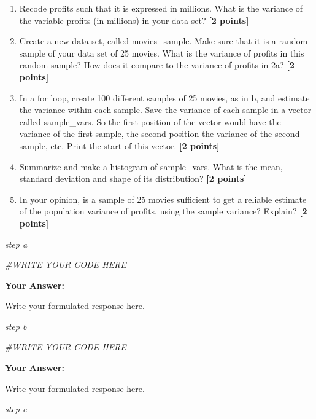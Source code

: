 \documentclass[
]{article}
\newenvironment{Shaded}{\begin{snugshade}}{\end{snugshade}}
\newcommand{\CommentTok}[1]{\textcolor[rgb]{0.56,0.35,0.01}{\textit{#1}}}
\providecommand{\tightlist}{%
  \setlength{\itemsep}{0pt}\setlength{\parskip}{0pt}}
\begin{document}
\begin{enumerate}
\def\labelenumi{\alph{enumi}.}
\tightlist
\item
  Recode profits such that it is expressed in millions. What is the
  variance of the variable profits (in millions) in your data set?
  \textbf{[2 points]}
\item
  Create a new data set, called movies\_sample. Make sure that it is a
  random sample of your data set of 25 movies. What is the variance of
  profits in this random sample? How does it compare to the variance of
  profits in 2a? \textbf{[2 points]}
\item
  In a for loop, create 100 different samples of 25 movies, as in b, and
  estimate the variance within each sample. Save the variance of each
  sample in a vector called sample\_vars. So the first position of the
  vector would have the variance of the first sample, the second
  position the variance of the second sample, etc. Print the start of
  this vector. \textbf{[2 points]}
\item
  Summarize and make a histogram of sample\_vars. What is the mean,
  standard deviation and shape of its distribution? \textbf{[2 points]}
\item
  In your opinion, is a sample of 25 movies sufficient to get a reliable
  estimate of the population variance of profits, using the sample
  variance? Explain? \textbf{[2 points]}
\end{enumerate}

\emph{step a}

\begin{Shaded}
\begin{Highlighting}[]
\CommentTok{\#WRITE YOUR CODE HERE}
\end{Highlighting}
\end{Shaded}

\textbf{Your Answer:}

Write your formulated response here.

\emph{step b}

\begin{Shaded}
\begin{Highlighting}[]
\CommentTok{\#WRITE YOUR CODE HERE}
\end{Highlighting}
\end{Shaded}

\textbf{Your Answer:}

Write your formulated response here.

\emph{step c}
\end{document}
